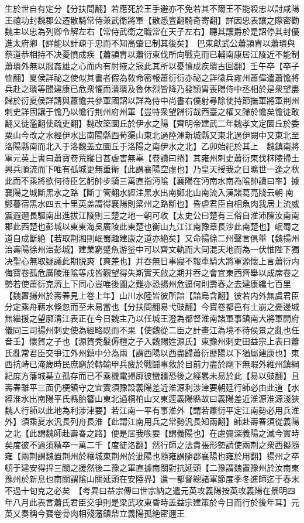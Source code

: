 生於世自有定分【分扶問翻】若應死於王手避亦不免若其不爾王不能殺忠以討咸陽王禧功封魏郡公遷散騎常侍兼武衛將軍【散悉亶翻騎奇寄翻】詳因忠表讓之際密勸魏主以忠為列卿令解左右【常侍武衛之職常在天子左右】聽其讓爵於是詔停其封優進太府卿【詳能以計疎于忠而不知高肇已制其後矣】　巴東獻武公蕭頴胄以蕭璝與蔡道恭相持不决憂憤成疾【蕭頴胄以蕭衍東伐所向戰克而已輔南康居江陵近不能制蕭璝外無以服姦雄之心而内有肘掖之宼此其所以憂憤成疾璝古回翻】壬午卒【卒子恤翻】夏侯詳祕之使似其書者假為敎命密報蕭衍衍亦祕之詳徵兵雍州蕭偉遣蕭憺將兵赴之璝等聞建康已危衆懼而潰璝及魯休烈皆降乃發頴胄喪贈侍中丞相於是衆望盡歸於衍夏侯詳請與蕭憺共參軍國詔以詳為侍中尚書右僕射尋除使持節撫軍將軍荆州刺史詳固讓于憺乃以憺行荆州府州軍【豈特衆望歸衍哉西臺之權又歸於憺矣憺徒敢翻又徒濫翻使疏吏翻】魏改築圜丘於伊水之陽【齊明帝建武二年魏孝文定圜丘於委粟山今改之水經伊水出南陽縣西荀渠山東北過陸渾新城縣又東北過伊闕中又東北至洛陽縣南而北入于洛魏盖立圜丘于洛陽之南伊水之北】乙卯始祀於其上　魏鎮南將軍元英上書曰蕭寶卷荒縱日甚虐害無辜【卷讀曰捲】其雍州刺史蕭衍東伐秣陵掃土興兵順流而下唯有孤城更無重衛【此謂襄陽空虛也】乃皇天授我之日曠世一逢之秋此而不乘將欲何待臣乞躬帥步騎三萬直指沔隂【襄陽在沔南水南為隂帥讀曰率】據襄陽之城斷黑水之路【斷丁管翻水經注黑水出南鄭北山南流入漢諸葛亮牋云朝南鄭暮宿黑水四五十里英盖謂得襄陽則梁州之路斷也】昏虐君臣自相魚肉我居上流威震遐邇長驅南出進拔江陵則三楚之地一朝可收【太史公曰楚有三俗自淮沛陳汝南南郡此西楚也彭城以東東海吳廣陵此東楚也衡山九江江南豫章長沙此南楚也】岷蜀之道自成斷絶【若取荆湘則岷蜀趣建康之道亦絶矣】又命揚徐二州聲言俱舉【魏揚州治壽陽徐州治彭城】建業窮蹙魚游釡中可以齊文軌而大同混天地而為一伏惟陛下獨决聖心無取疑議此期脱爽【爽差也】并吞無日事寢不報車騎大將軍源懷上言蕭衍内侮寶卷孤危廣陵淮隂等戍皆觀望得失斯實天啟之期并吞之會宜東西齊舉以成席卷之勢若使蕭衍克濟上下同心豈唯後圖之難亦恐揚州危逼何則壽春之去建康纔七百里【魏置揚州於壽春見上卷上年】山川水陸皆彼所諳【諳烏含翻】彼若内外無虞君臣分定乘舟藉水倏忽而至未易當也【分扶問翻易弋豉翻】今寶卷都邑有土崩之憂邊城無繼援之望廓清江表正在今日魏主乃以任城王澄為都督淮南諸軍事鎮南大將軍開府儀同三司揚州刺史使為經略既而不果【使魏從二臣之計畫江為境不待侯景之亂也任音壬】懷賀之子也【源賀秃髮傉檀之子入魏賜姓源氏】東豫州刺史田益宗上表曰蕭氏亂常君臣交爭江外州鎮中分為兩【謂西陽以西盡歸蕭衍歷陽以下猶屬建康也】東西抗峙已淹歲時民庶窮於轉輸甲兵疲於戰鬪事救於目前力盡於麾下無暇外維州鎮綱紀庶方藩城棊立孤存而已不乘機電掃廓彼蠻疆恐後之經畧未易於此【易以豉翻】且壽春雖平三面仍梗鎮守之宜實須豫設義陽差近淮源利涉津要朝廷行師必由此道【水經淮水出南陽平氏縣胎簪山東北過桐柏山又東逕義陽縣故曰義陽差近淮源淮源淺狹魏人行師以此地為利涉津要】若江南一平有事淮外【謂若蕭衍平定江南勢必用兵淮外】須乘夏水汎長列舟長淮【此謂江南用兵之常勢汎長知兩翻】師赴壽春須從義陽之北【此謂魏師赴壽春之路】便是居我㗋要【謂義陽也】在慮彌深義陽之滅今實時矣度彼不過須精卒一萬二千【度徒洛翻】然行師之法貴張形勢請使兩荆之衆西擬隨雍【兩荆謂魏置荆州於穰城東荆州於泚陽也隨雍謂隨郡襄陽也雍於用翻】揚州之卒頓于建安得捍三關之援然後二豫之軍直據南關對抗延頭【二豫謂魏置豫州於汝南東豫州於新息也南關謂隂山關延頭在安陸界】遣一都督總諸軍節度季冬進師迄于春末不過十旬克之必矣　【考異曰益宗傳曰世宗納之遣元英攻義陽按英攻義陽在景明四年八月此表言蕭氏君臣交爭則是梁武攻東昏時盖益宗建策於今日而行於後年耳】元英又奏稱今寶卷骨肉相殘藩鎮鼎立義陽孤絶密邇王